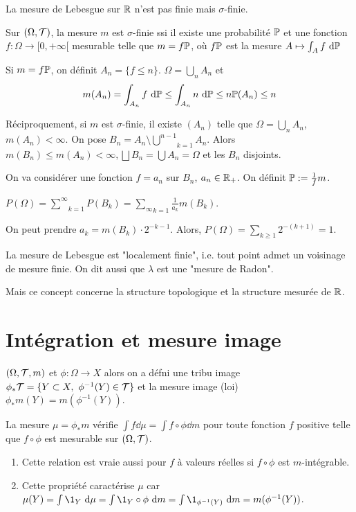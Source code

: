 \documentclass[10pt,a4paper,notitlepage ]{report}
\begin{document}
\begin{rem}
	La mesure de Lebesgue sur $\mathbb R$ n'est pas finie mais $\sigma$-finie.
\end{rem}

\begin{lemme}
	Sur $(\Omega,\mathcal T)$, la mesure $m$ est $\sigma$-finie ssi il existe une probabilité $\mathbb P$ et une fonction $f:\Omega \rightarrow [0,+\infty[$ mesurable telle que $m=f\mathbb P$, où $f\mathbb P$ est la mesure $A\mapsto \int_A f\ \mathrm d\mathbb P$
\end{lemme}

\begin{demo}
	Si $m=f\mathbb P$, on définit $A_n=\{f\le n\}$.
	$\Omega = \underset n \bigcup A_n$ et 
	\[m(A_n) = \int_{A_n}f\ \mathrm d\mathbb P \le \int_{A_n}n\ \mathrm d\mathbb P \le n\mathbb P(A_n) \le n\]
	
	Réciproquement, si $m$ est $\sigma$-finie, il existe $(A_n)$ telle que $\Omega = \underset n \bigcup A_n$, $m(A_n) < \infty$. On pose $B_n = A_n \setminus \underset{k=1} {\overset {n-1} \bigcup} A_n$. Alors $m(B_n) \le m(A_n) < \infty, \bigsqcup B_n = \bigcup A_n = \Omega$ et les $B_n$ disjoints.
	
	On va considérer une fonction $f=a_n$ sur $B_n$, $a_n \in \mathbb R_+$. On définit $\mathbb P := \frac 1 f m$.
	
	$P(\Omega) = \underset{k=1}{\overset \infty \sum} P(B_k) = \underset{k=1}{\underset \infty \sum} \frac 1 {a_k} m(B_k)$.
	
	On peut prendre $a_k=m(B_k)\cdot 2^{-k-1}$. Alors, $P(\Omega) = \sum_{k\ge 1} 2^{-(k+1)} = 1$.
\end{demo}

\begin{rem}
	La mesure de Lebesgue est "localement finie", i.e. tout point admet un voisinage de mesure finie. On dit aussi que $\lambda$ est une "mesure de Radon".
	
	Mais ce concept concerne la structure topologique et la structure mesurée de $\mathbb R$.
\end{rem}

\section{Intégration et mesure image}
	$(\Omega,\mathcal T,m)$ et $\phi:\Omega \rightarrow X$ alors on a défni une tribu image $\phi_*\mathcal T = \{Y\subset X,\ \phi^{-1}(Y)\in\mathcal T\}$ et la mesure image (loi) $\phi_*m(Y) = m(\phi^{-1}(Y))$.

\begin{propriete}
	La mesure $\mu=\phi_*m$ vérifie $\int f\dd\mu = \int f \circ \phi \dd m$ pour toute fonction $f$ positive telle que $f\circ \phi$ est mesurable sur $(\Omega,\mathcal T)$.
\end{propriete}
\begin{rem}
	\begin{enumerate}
		\item Cette relation est vraie aussi pour $f$ à valeurs réelles si $f\circ\phi$ est $m$-intégrable.
		\item Cette propriété caractérise $\mu$ car $\mu(Y)=\int\1_Y\dd\mu = \int \1_Y \circ \phi \dd m = \int \1_{\phi^{-1}(Y)}\dd m = m(\phi^{-1}(Y))$.
	\end{enumerate}
\end{rem}
\end{document}
